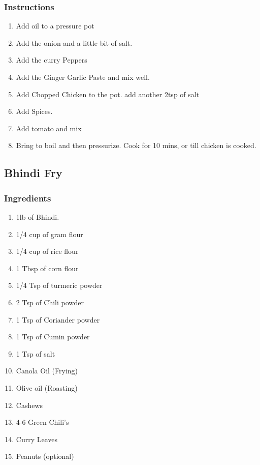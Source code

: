 \documentclass[11pt]{article}
\begin{document}
\subsubsection*{Instructions}
\label{sec:org9176b46}
\begin{enumerate}
\item Add oil to a pressure pot
\item Add the onion and a little bit of salt.
\item Add the curry Peppers
\item Add the Ginger Garlic Paste and mix well.
\item Add Chopped Chicken to the pot. add another 2tsp of salt
\item Add Spices.
\item Add tomato and mix
\item Bring to boil and then pressurize. Cook for 10  mins, or till chicken is cooked.
\end{enumerate}
\subsection{Bhindi Fry}
\label{sec:orga8bb3e1}
\subsubsection*{Ingredients}
\label{sec:org2603f3a}
\begin{enumerate}
\item 1lb of Bhindi.
\item 1/4 cup of gram flour
\item 1/4 cup of rice flour
\item 1 Tbsp of corn flour
\item 1/4 Tsp of turmeric powder
\item 2 Tsp of Chili powder
\item 1 Tsp of Coriander powder
\item 1 Tsp of Cumin powder
\item 1 Tsp of salt
\item Canola Oil (Frying)
\item Olive oil (Roasting)
\item Cashews
\item 4-6 Green Chili's
\item Curry Leaves
\item Peanuts (optional)
\end{enumerate}
\end{document}
